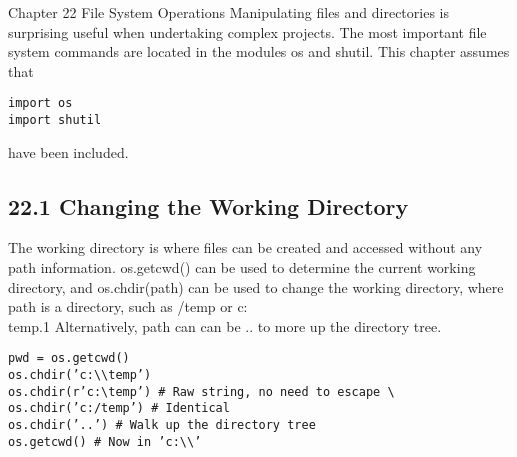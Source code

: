 Chapter 22
File System Operations
Manipulating files and directories is surprising useful when undertaking complex projects. The most important
file system commands are located in the modules os and shutil. This chapter assumes that
\begin{framed}
\begin{verbatim}
import os
import shutil
\end{verbatim}
\end{framed}
have been included.
\subsection{22.1 Changing the Working Directory}
The working directory is where files can be created and accessed without any path information. os.getcwd()
can be used to determine the current working directory, and os.chdir(path) can be used to change the
working directory, where path is a directory, such as /temp or c:\\temp.1 Alternatively, path can can be .. to
more up the directory tree.
\begin{framed}
\begin{verbatim}
pwd = os.getcwd()
os.chdir(’c:\\temp’)
os.chdir(r’c:\temp’) # Raw string, no need to escape \
os.chdir(’c:/temp’) # Identical
os.chdir(’..’) # Walk up the directory tree
os.getcwd() # Now in ’c:\\’
\end{verbatim}
\end{framed}
